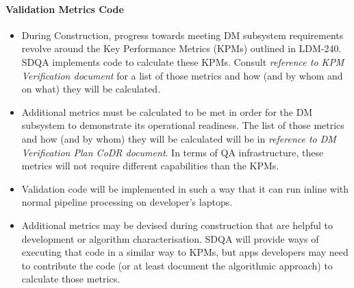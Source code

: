 \paragraph{Validation Metrics Code}
\label{sec:qaValidate}
\begin{itemize}

[VERIFICATION] 

\item During Construction, progress towards meeting DM subsystem requirements revolve around the Key Performance Metrics (KPMs) outlined in LDM-240. SDQA implements code to calculate these KPMs. Consult \emph{ reference to KPM Verification document} for a list of those metrics and how (and by whom and on what) they will be calculated.

\item Additional metrics must be calculated to be met in order for the DM subsystem to demonstrate its operational readiness. The list of those metrics and how (and by whom) they will be calculated will be in \emph{reference to DM Verification Plan CoDR document}. In terms of QA infrastructure, these metrics will not require different capabilities than the KPMs.

\item Validation code will be implemented in such a way that it can run inline with normal pipeline processing on developer's laptops.

\item Additional metrics may be devised during construction that are helpful to development or algorithm characterisation. SDQA will provide ways of executing that code in a similar way to KPMs, but apps developers may need to contribute the code (or at least document the algorithmic approach) to calculate those metrics.

\end{itemize}

